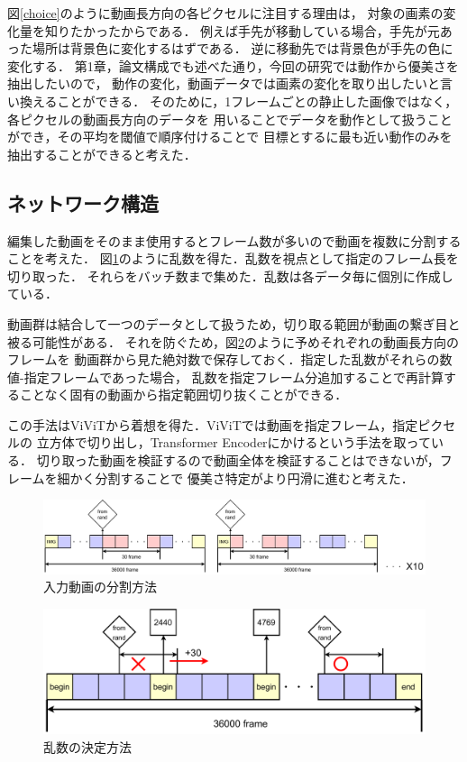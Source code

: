 図\ref{choice}のように動画長方向の各ピクセルに注目する理由は，
対象の画素の変化量を知りたかったからである．
例えば手先が移動している場合，手先が元あった場所は背景色に変化するはずである．
逆に移動先では背景色が手先の色に変化する．
第1章，論文構成でも述べた通り，今回の研究では動作から優美さを抽出したいので，
動作の変化，動画データでは画素の変化を取り出したいと言い換えることができる．
そのために，1フレームごとの静止した画像ではなく，各ピクセルの動画長方向のデータを
用いることでデータを動作として扱うことができ，その平均を閾値で順序付けることで
目標とするに最も近い動作のみを抽出することができると考えた．
\clearpage

\subsection{ネットワーク構造}
編集した動画をそのまま使用するとフレーム数が多いので動画を複数に分割することを考えた．
図\ref{range}のように乱数を得た．乱数を視点として指定のフレーム長を切り取った．
それらをバッチ数まで集めた．乱数は各データ毎に個別に作成している．

動画群は結合して一つのデータとして扱うため，切り取る範囲が動画の繋ぎ目と被る可能性がある．
それを防ぐため，図\ref{decide_rand}のように予めそれぞれの動画長方向のフレームを
動画群から見た絶対数で保存しておく．指定した乱数がそれらの数値-指定フレームであった場合，
乱数を指定フレーム分追加することで再計算することなく固有の動画から指定範囲切り抜くことができる．

この手法はViViTから着想を得た．ViViTでは動画を指定フレーム，指定ピクセルの
立方体で切り出し，Transformer Encoderにかけるという手法を取っている．
切り取った動画を検証するので動画全体を検証することはできないが，フレームを細かく分割することで
優美さ特定がより円滑に進むと考えた．

\begin{figure}[b]
  \begin{center}
    \includegraphics[width=120mm]{images/chart/range.pdf}
  \end{center}
  \caption{入力動画の分割方法}
  \label{range}
\end{figure}

\begin{figure}[b]
  \begin{center}
    \includegraphics[width=120mm]{images/chart/decide_rand.pdf}
  \end{center}
  \caption{乱数の決定方法}
  \label{decide_rand}
\end{figure}
\clearpage

